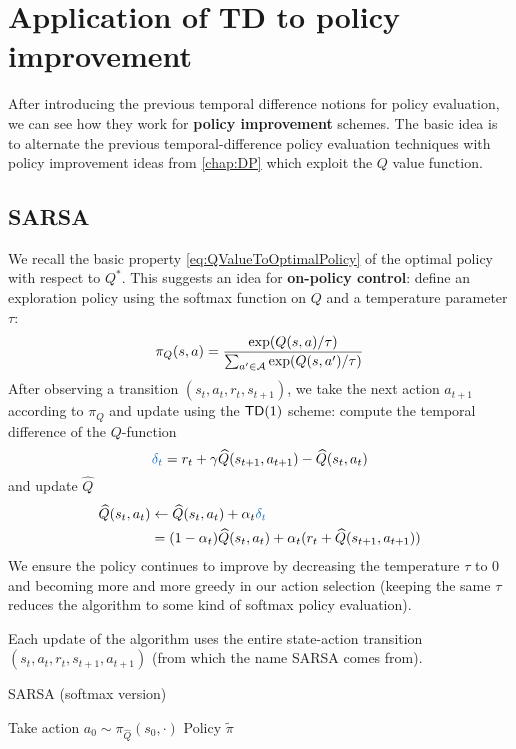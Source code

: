 \documentclass[../course-notes.tex]{subfiles}
\begin{document}
\section{Application of TD to policy improvement}

After introducing the previous temporal difference notions for policy evaluation, we can see how they work for \textbf{policy improvement} schemes. The basic idea is to alternate the previous temporal-difference policy evaluation techniques with policy improvement ideas from \cref{chap:DP} which exploit the $Q$ value function.

\subsection{SARSA}

We recall the basic property \eqref{eq:QValueToOptimalPolicy} of the optimal policy with respect to $Q^*$. This suggests an idea for \textbf{on-policy control}: define an exploration policy using the softmax function on $Q$ and a temperature parameter $\tau$:
\[
	\pi_Q(s,a) =
	\frac{\exp(Q(s,a)/\tau)}{
		\sum_{a'\in\mathcal{A}} \exp(Q(s,a')/\tau)
	}
\]
After observing a transition $(s_t, a_t, r_t, s_{t+1})$, we take the next action $a_{t+1}$ according to $\pi_Q$ and update using the $\mathsf{TD}(1)$ scheme: compute the temporal difference of the $Q$-function
\begin{equation}\label{eq:QfuncTDerror}
	{\bluefont \delta_t} = r_t + \gamma \widehat{Q}(s_{t+1}, a_{t+1}) - \widehat{Q}(s_t, a_t)
\end{equation}
and update $\widehat{Q}$
\begin{equation*}
\begin{aligned}
	\widehat{Q}(s_t, a_t) &\leftarrow
	\widehat{Q}(s_t, a_t) + \alpha_t {\bluefont \delta_t}  \\
	&= (1-\alpha_t)\widehat{Q}(s_t, a_t)
	+ \alpha_t (r_t + \widehat{Q}(s_{t+1}, a_{t+1}))
\end{aligned}
\end{equation*}
We ensure the policy continues to improve by decreasing the temperature $\tau$ to 0 and becoming more and more greedy in our action selection (keeping the same $\tau$ reduces the algorithm to some kind of softmax policy evaluation).

Each update of the algorithm uses the entire state-action transition $(s_t,a_t,r_t,s_{t+1},a_{t+1})$ (from which the name SARSA comes from).

\begin{algorithm}
	\caption{SARSA (softmax version)}
	Take action $a_0 \sim \pi_{\widehat{Q}}(s_0, \cdot)$\;
	\Return Policy $\tilde{\pi}$\;
\end{algorithm}
\end{document}
